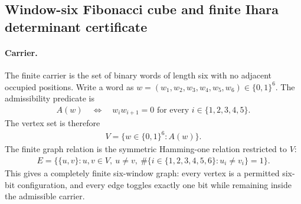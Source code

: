 
\subsection{Window-six Fibonacci cube and finite Ihara determinant certificate}
\label{sec:window6-fibonacci-cube-ihara-zeta-certificate}

\paragraph{Carrier.}
The finite carrier is the set of binary words of length six with no adjacent occupied positions.  Write a word as $w=(w_1,w_2,w_3,w_4,w_5,w_6) \in \{0,1\}^6$.  The admissibility predicate is
$$
\begin{aligned}
A(w) \quad \Longleftrightarrow \quad w_i w_{i+1}=0 \text{ for every } i \in \{1,2,3,4,5\}.
\end{aligned}
$$
The vertex set is therefore
$$
\begin{aligned}
V=\{w \in \{0,1\}^6 : A(w)\}.
\end{aligned}
$$
The finite graph relation is the symmetric Hamming-one relation restricted to $V$:
$$
\begin{aligned}
E=\{\{u,v\}: u,v \in V,\ u \ne v,\ \#\{i \in \{1,2,3,4,5,6\}:u_i \ne v_i\}=1\}.
\end{aligned}
$$
This gives a completely finite six-window graph: every vertex is a permitted six-bit configuration, and every edge toggles exactly one bit while remaining inside the admissible carrier.

